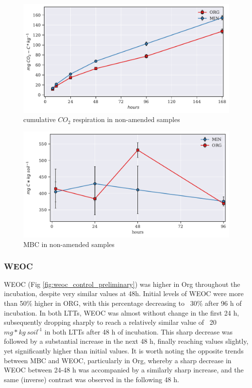 \documentclass[12pt]{report}
\newlength{\SpaceAfterUnit}
\newcommand{\genericunit}{$ mg * kg\ soil^{\text{-}1}$ \hspace*{\SpaceAfterUnit}}
\begin{document}
    \begin{figure}[H]
    	\centering
    	\includegraphics[scale=0.8]{thesis_figures/preliminary/Cum_Resp_CON.pdf}
    	\caption{cumulative $CO_2$ respiration in non-amended samples}
    	\label{fig:cum_resp_control_preliminary}
    \end{figure}
    
    \begin{figure}[H]
        \centering
        \includegraphics[scale=0.8, ]{thesis_figures/preliminary/control/MBC.pdf}
        \caption{MBC in non-amended samples}
        \label{fig:mbc_control_preliminary}
    \end{figure}
    
    \subsubsection{WEOC}
        WEOC  (Fig \ref{fig:weoc_control_preliminary}) was higher in Org throughout the incubation, despite very similar values at 48h. Initial levels of WEOC were more than 50$\%$ higher in ORG, with this percentage decreasing to ~30$\%$ after 96 h of incubation. In both LTTs, WEOC was almost without change in the first 24 h, subsequently dropping sharply to reach a relatively similar value of ~20 \genericunit in both LTTs after 48 h of incubation. This sharp decrease was followed by a substantial increase in the next 48 h, finally reaching values  slightly, yet significantly higher than initial values. It is worth noting the opposite trends between MBC and WEOC, particularly in  Org, whereby  a sharp decrease in WEOC between 24-48 h was accompanied by a similarly sharp increase, and the same (inverse) contrast was observed in the following 48 h.
\end{document}
